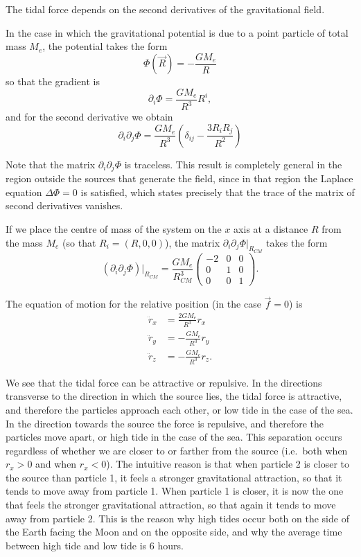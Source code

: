 \begin{points}
\item The tidal force depends on the second derivatives of the gravitational field.

\item In the case in which the gravitational potential is due to a point particle of total mass $M_e$, the potential takes the form
\[
  \Phi(\vec R)=-\frac{GM_e}{R}
\]
so that the gradient is
\[
  \partial_i\Phi=\frac{GM_e}{R^3}R^i,
\]
and for the second derivative we obtain
\[
  \partial_i\partial_j\Phi=\frac{GM_e}{R^3}\left(\delta_{ij}-\frac{3R_iR_j}{R^2}\right)
\]

\item Note that the matrix $\partial_i\partial_j\Phi$ is traceless. This result is completely general in the region outside the sources that generate the field, since in that region the Laplace equation $\Delta\Phi=0$ is satisfied, which states precisely that the trace of the matrix of second derivatives vanishes.

\item If we place the centre of mass of the system on the $x$ axis at a distance $R$ from the mass $M_e$ (so that $R_i=(R,0,0)$), the matrix $\partial_i\partial_j\Phi|_{R_{CM}}$ takes the form
\[
  (\partial_i\partial_j\Phi)|_{R_{CM}}=\frac{GM_e}{R^3_{CM}}\left(\begin{array}{ccc}-2&0&0\\0&1&0\\0&0&1\end{array}\right).
\]

\item The equation of motion for the relative position (in the case $\vec f=0$) is
\begin{align*}
  \ddot r_x&=\frac{2GM_e}{R^3}r_x\\
  \ddot r_y&=-\frac{GM_e}{R^3}r_y\\
  \ddot r_z&=-\frac{GM_e}{R^3}r_z.
\end{align*}

\item We see that the tidal force can be attractive or repulsive. In the directions transverse to the direction in which the source lies, the tidal force is attractive, and therefore the particles approach each other, or low tide in the case of the sea. In the direction towards the source the force is repulsive, and therefore the particles move apart, or high tide in the case of the sea. This separation occurs regardless of whether we are closer to or farther from the source (i.e.\ both when $r_x>0$ and when $r_x<0$). The intuitive reason is that when particle 2 is closer to the source than particle 1, it feels a stronger gravitational attraction, so that it tends to move away from particle 1. When particle 1 is closer, it is now the one that feels the stronger gravitational attraction, so that again it tends to move away from particle 2. This is the reason why high tides occur both on the side of the Earth facing the Moon and on the opposite side, and why the average time between high tide and low tide is 6 hours.


\end{points}
